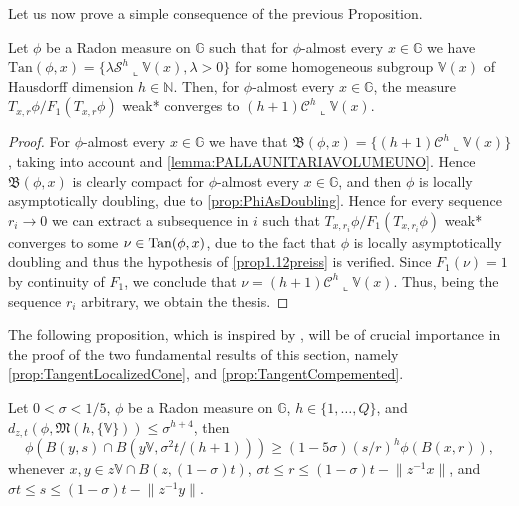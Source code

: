 \documentclass[10pt, a4paper,
oneside, headinclude,footinclude]{scrartcl}
\begin{document}
Let us now prove a simple consequence of the previous Proposition.
\begin{proposizione}\label{prop:ConvergencePreiss}
Let $\phi$ be a Radon measure on $\mathbb G$ such that for $\phi$-almost every $x\in\mathbb G$ we have $\mathrm{Tan}(\phi,x)=\{\lambda\mathcal{S}^h\llcorner\mathbb V(x),\lambda>0\}$ for some homogeneous subgroup $\mathbb V(x)$ of Hausdorff dimension $h\in\mathbb N$. Then, for $\phi$-almost every $x\in\mathbb G$, the measure $T_{x,r}\phi/F_1(T_{x,r}\phi)$ weak* converges to $(h+1)\mathcal{C}^h\llcorner\mathbb V(x)$.
\end{proposizione}

\begin{proof}
For $\phi$-almost every $x\in\mathbb G$ we have that $\mathfrak{B}(\phi,x)=\{(h+1)\mathcal{C}^h\llcorner\mathbb V(x)\}$, taking into account \cite[Proposition 2.12]{antonelli2020rectifiable} and \cref{lemma:PALLAUNITARIAVOLUMEUNO}. Hence $\mathfrak{B}(\phi,x)$ is clearly compact for $\phi$-almost every $x\in\mathbb G$, and then $\phi$ is locally asymptotically doubling, due to \cref{prop:PhiAsDoubling}. Hence for every sequence $r_i\to 0$ we can extract a subsequence in $i$ such that $T_{x,r_i}\phi/F_1(T_{x,r_i}\phi)$ weak* converges to some $\nu\in\mathrm{Tan}(\phi,x)$, due to the fact that $\phi$ is locally asymptotically doubling and thus the hypothesis of \cref{prop1.12preiss} is verified. Since $F_1(\nu)=1$ by continuity of $F_1$, we conclude that $\nu=(h+1)\mathcal{C}^h\llcorner\mathbb V(x)$. Thus, being the sequence $r_i$ arbitrary, we obtain the thesis.
\end{proof}

The following proposition, which is inspired by \cite[4.4(4)]{Preiss1987GeometryDensities}, will be of crucial importance in the proof of the two fundamental results of this section, namely \cref{prop:TangentLocalizedCone}, and \cref{prop:TangentCompemented}.

\begin{proposizione}\label{prop:bdonplanes}
Let $0<\sigma<1/5$, $\phi$ be a Radon measure on $\mathbb{G}$, $h\in\{1,\ldots, Q\}$, and
$d_{z,t}(\phi,\mathfrak{M}(h,\{\mathbb{V}\}))\leq \sigma^{h+4}$,
then
$$\phi(B(y,s)\cap B(y\mathbb{V},\sigma^2t/(h+1)))\geq (1-5\sigma)(s/r)^h\phi(B(x,r)),$$
whenever $x,y\in z\mathbb{V}\cap B(z,(1-\sigma)t)$, $\sigma t\leq r\leq (1-\sigma)t-\lVert z^{-1}x\rVert$, and $\sigma t\leq s\leq (1-\sigma)t-\lVert z^{-1}y\rVert$.
\end{proposizione}
\end{document}
